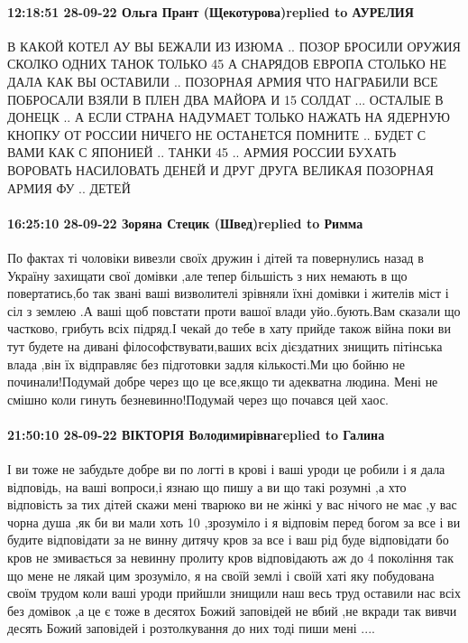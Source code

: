 \paragraph{12:18:51 28-09-22 Ольга Прант (Щекотурова)replied to АУРЕЛИЯ}

В КАКОЙ КОТЕЛ АУ ВЫ БЕЖАЛИ ИЗ ИЗЮМА .. ПОЗОР БРОСИЛИ ОРУЖИЯ СКОЛКО ОДНИХ ТАНОК
ТОЛЬКО 45 А СНАРЯДОВ ЕВРОПА СТОЛЬКО НЕ ДАЛА КАК ВЫ ОСТАВИЛИ .. ПОЗОРНАЯ АРМИЯ
ЧТО НАГРАБИЛИ ВСЕ ПОБРОСАЛИ ВЗЯЛИ В ПЛЕН ДВА МАЙОРА И 15 СОЛДАТ ... ОСТАЛЫЕ В
ДОНЕЦК .. А ЕСЛИ СТРАНА НАДУМАЕТ ТОЛЬКО НАЖАТЬ НА ЯДЕРНУЮ КНОПКУ ОТ РОССИИ
НИЧЕГО НЕ ОСТАНЕТСЯ ПОМНИТЕ .. БУДЕТ С ВАМИ КАК С ЯПОНИЕЙ .. ТАНКИ 45 .. АРМИЯ
РОССИИ БУХАТЬ ВОРОВАТЬ НАСИЛОВАТЬ ДЕНЕЙ И ДРУГ ДРУГА ВЕЛИКАЯ ПОЗОРНАЯ АРМИЯ ФУ
.. ДЕТЕЙ


\paragraph{16:25:10 28-09-22 Зоряна Стецик (Швед)replied to Римма}

По фактах ті чоловіки вивезли своїх дружин і дітей та повернулись назад в
Україну захищати свої домівки ,але тепер більшість з них немають в що
повертатись,бо так звані ваші визволителі зрівняли їхні домівки і жителів міст
і сіл з землею .А ваші щоб повстати проти вашої влади уйо..бують.Вам сказали що
частково, грибуть всіх підряд.І чекай до тебе в хату прийде також війна поки ви
тут будете на дивані філософствувати,ваших всіх дієздатних знищить пітінська
влада ,він їх відправляє без підготовки задля кількості.Ми цю бойню не
починали!Подумай добре через що це все,якщо ти адекватна людина. Мені не смішно
коли гинуть безневинно!Подумай через що почався цей хаос.

\paragraph{21:50:10 28-09-22 ВІКТОРІЯ Володимирівнаreplied to Галина}

І ви тоже не забудьте добре ви по логті в крові і ваші уроди це робили і я дала
відповідь, на ваші вопроси,і язнаю що пишу а ви що такі розумні ,а хто
відповість за тих дітей скажи мені тварюко ви не жінкі у вас нічого не має ,у
вас чорна душа ,як би ви мали хоть 10 %
,зрозуміло і я відповім перед богом за все і ви будите відповідати за не винну
дитячу кров за все і ваш рід буде відповідати бо кров не змивається за невинну
пролиту кров відповідають аж до 4 покоління так що мене не лякай цим зрозуміло,
я на своїй землі і своїй хаті яку побудована своїм трудом коли ваші уроди
прийшли знищили наш весь труд оставили нас всіх без домівок ,а це є тоже в
десятох Божий заповідей не вбий ,не вкради так вивчи десять Божий заповідей і
розтолкування до них тоді пиши мені ....


